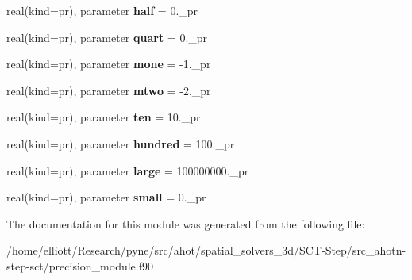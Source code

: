 \begin{DoxyCompactItemize}
\item 
\hypertarget{classprecision__module_a2975299bd4cad0c5fc29b217c7a3c55a}{real(kind=pr), parameter {\bfseries half} = 0.\-\_\-pr}\label{classprecision__module_a2975299bd4cad0c5fc29b217c7a3c55a}

\item 
\hypertarget{classprecision__module_a0517b994d0f7952d498a1242fb834718}{real(kind=pr), parameter {\bfseries quart} = 0.\-\_\-pr}\label{classprecision__module_a0517b994d0f7952d498a1242fb834718}

\item 
\hypertarget{classprecision__module_aa814d5147dc4064661bf0010f9ee044f}{real(kind=pr), parameter {\bfseries mone} = -\/1.\-\_\-pr}\label{classprecision__module_aa814d5147dc4064661bf0010f9ee044f}

\item 
\hypertarget{classprecision__module_ab2bbff5634ef6e43b944fa5dbaa013c3}{real(kind=pr), parameter {\bfseries mtwo} = -\/2.\-\_\-pr}\label{classprecision__module_ab2bbff5634ef6e43b944fa5dbaa013c3}

\item 
\hypertarget{classprecision__module_a8c8a6d6ed3f94ec0e37884f3f2b3700c}{real(kind=pr), parameter {\bfseries ten} = 10.\-\_\-pr}\label{classprecision__module_a8c8a6d6ed3f94ec0e37884f3f2b3700c}

\item 
\hypertarget{classprecision__module_a391d84726af18dbfd50c69c1292499ab}{real(kind=pr), parameter {\bfseries hundred} = 100.\-\_\-pr}\label{classprecision__module_a391d84726af18dbfd50c69c1292499ab}

\item 
\hypertarget{classprecision__module_af2e8673d0687c8aec5af0efa8b6d4060}{real(kind=pr), parameter {\bfseries large} = 100000000.\-\_\-pr}\label{classprecision__module_af2e8673d0687c8aec5af0efa8b6d4060}

\item 
\hypertarget{classprecision__module_ae2f943dd65cbd67271dcbd024d72b834}{real(kind=pr), parameter {\bfseries small} = 0.\-\_\-pr}\label{classprecision__module_ae2f943dd65cbd67271dcbd024d72b834}

\end{DoxyCompactItemize}


The documentation for this module was generated from the following file\-:\begin{DoxyCompactItemize}
\item 
/home/elliott/\-Research/pyne/src/ahot/spatial\-\_\-solvers\-\_\-3d/\-S\-C\-T-\/\-Step/src\-\_\-ahotn-\/step-\/sct/precision\-\_\-module.\-f90\end{DoxyCompactItemize}

